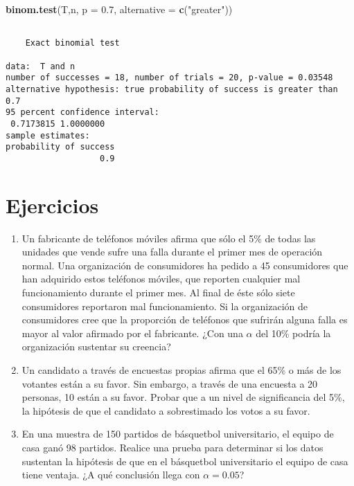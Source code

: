 \documentclass[
  a4paper,
  oneside,
  openany]{book}
\newenvironment{Shaded}{\begin{snugshade}}{\end{snugshade}}
\newcommand{\AttributeTok}[1]{\textcolor[rgb]{0.13,0.29,0.53}{#1}}
\newcommand{\FloatTok}[1]{\textcolor[rgb]{0.00,0.00,0.81}{#1}}
\newcommand{\FunctionTok}[1]{\textcolor[rgb]{0.13,0.29,0.53}{\textbf{#1}}}
\newcommand{\NormalTok}[1]{#1}
\newcommand{\StringTok}[1]{\textcolor[rgb]{0.31,0.60,0.02}{#1}}
\begin{document}
\begin{Shaded}
\begin{Highlighting}[]
\FunctionTok{binom.test}\NormalTok{(T,n, }\AttributeTok{p =} \FloatTok{0.7}\NormalTok{, }\AttributeTok{alternative =} \FunctionTok{c}\NormalTok{(}\StringTok{"greater"}\NormalTok{))}
\end{Highlighting}
\end{Shaded}

\begin{verbatim}

    Exact binomial test

data:  T and n
number of successes = 18, number of trials = 20, p-value = 0.03548
alternative hypothesis: true probability of success is greater than 0.7
95 percent confidence interval:
 0.7173815 1.0000000
sample estimates:
probability of success 
                   0.9 
\end{verbatim}

\hypertarget{ejercicios}{%
\section{Ejercicios}\label{ejercicios}}

\begin{enumerate}
\def\labelenumi{\arabic{enumi}.}
\item
  Un fabricante de teléfonos móviles afirma que sólo el 5\% de todas las unidades que vende sufre una falla durante el primer mes de operación normal. Una organización de consumidores ha pedido a 45 consumidores que han adquirido estos teléfonos móviles, que reporten cualquier mal funcionamiento durante el primer mes. Al final de éste sólo siete consumidores reportaron mal funcionamiento. Si la organización de consumidores cree que la proporción de teléfonos que sufrirán alguna falla es mayor al valor afirmado por el fabricante. ¿Con una \(\alpha\) del 10\% podría la organización sustentar su creencia?
\item
  Un candidato a través de encuestas propias afirma que el 65\% o más de los votantes están a su favor. Sin embargo, a través de una encuesta a 20 personas, 10 están a su favor. Probar que a un nivel de significancia del 5\%, la hipótesis de que el candidato a sobrestimado los votos a su favor.
\item
  En una muestra de 150 partidos de básquetbol universitario, el equipo de casa ganó 98 partidos. Realice una prueba para determinar si los datos sustentan la hipótesis de que en el básquetbol universitario el equipo de casa tiene ventaja. ¿A qué conclusión llega con \(\alpha= 0.05\)?
\end{enumerate}
\end{document}
